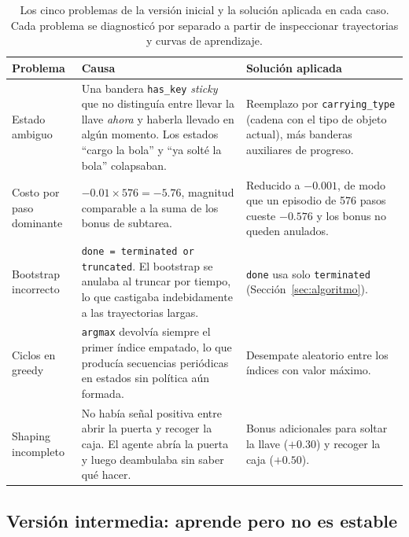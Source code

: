 \documentclass[11pt,a4paper]{article}
\begin{document}
\begin{table}[h]
  \centering
  \small
  \setlength{\extrarowheight}{3pt}
  \begin{tabularx}{\linewidth}{l X X}
    \toprule
    \textbf{Problema} & \textbf{Causa} & \textbf{Solución aplicada} \\
    \midrule
    Estado ambiguo &
      Una bandera \texttt{has\_key} \emph{sticky} que no distinguía
      entre llevar la llave \emph{ahora} y haberla llevado en algún
      momento. Los estados ``cargo la bola'' y ``ya solté la bola''
      colapsaban. &
      Reemplazo por \texttt{carrying\_type} (cadena con el tipo de
      objeto actual), más banderas auxiliares de progreso. \\
    Costo por paso dominante &
      \(-0.01 \times 576 = -5.76\), magnitud comparable a la suma de
      los bonus de subtarea. &
      Reducido a \(-0.001\), de modo que un episodio de 576 pasos cueste
      \(-0.576\) y los bonus no queden anulados. \\
    Bootstrap incorrecto &
      \texttt{done = terminated or truncated}. El bootstrap se anulaba
      al truncar por tiempo, lo que castigaba indebidamente a las
      trayectorias largas. &
      \texttt{done} usa solo \texttt{terminated}
      (Sección~\ref{sec:algoritmo}). \\
    Ciclos en greedy &
      \texttt{argmax} devolvía siempre el primer índice empatado, lo
      que producía secuencias periódicas en estados sin política aún
      formada. &
      Desempate aleatorio entre los índices con valor máximo. \\
    Shaping incompleto &
      No había señal positiva entre abrir la puerta y recoger la caja.
      El agente abría la puerta y luego deambulaba sin saber qué
      hacer. &
      Bonus adicionales para soltar la llave (\(+0.30\)) y recoger la
      caja (\(+0.50\)). \\
    \bottomrule
  \end{tabularx}
  \caption{Los cinco problemas de la versión inicial y la solución
  aplicada en cada caso. Cada problema se diagnosticó por separado a
  partir de inspeccionar trayectorias y curvas de aprendizaje.}
  \label{tab:problemas}
\end{table}

\subsection{Versión intermedia: aprende pero no es estable}
\end{document}
